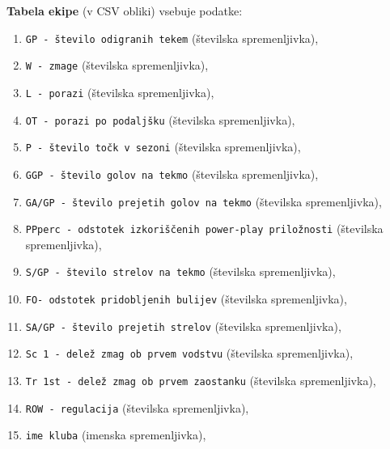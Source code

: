 \documentclass[11pt,a4paper]{article}
\begin{document}
\textbf{Tabela ekipe} (v CSV obliki) vsebuje podatke:
\begin{enumerate}
\item{\verb|GP - število odigranih tekem| (številska spremenljivka),}
\item{\verb|W - zmage| (številska spremenljivka),}
\item{\verb|L - porazi| (številska spremenljivka),}
\item{\verb|OT - porazi po podaljšku| (številska spremenljivka),}
\item{\verb|P - število točk v sezoni| (številska spremenljivka),}
\item{\verb|GGP - število golov na tekmo| (številska spremenljivka),}
\item{\verb|GA/GP - število prejetih golov na tekmo| (številska spremenljivka),}
\item{\verb|PPperc - odstotek izkoriščenih power-play priložnosti| (številska spremenljivka),}
\item{\verb|S/GP - število strelov na tekmo| (številska spremenljivka),}
\item{\verb|FO- odstotek pridobljenih bulijev| (številska spremenljivka),}
\item{\verb|SA/GP - število prejetih strelov| (številska spremenljivka),}
\item{\verb|Sc 1 - delež zmag ob prvem vodstvu| (številska spremenljivka),}
\item{\verb|Tr 1st - delež zmag ob prvem zaostanku| (številska spremenljivka),}
\item{\verb|ROW - regulacija| (številska spremenljivka),}
\item{\verb|ime kluba| (imenska spremenljivka),}
\end{enumerate}
\end{document}
